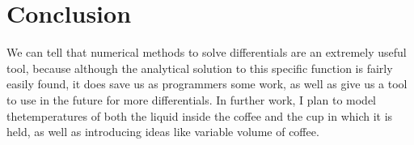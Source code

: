 \documentclass[12pt]{article}
\begin{document}
\section{Conclusion}
We can tell that numerical methods to solve differentials are an extremely useful tool, because although the analytical solution to this specific function is fairly easily found, it does save us as programmers some work, as well as give us a tool to use in the future for more differentials. In further work, I plan to model thetemperatures of both the liquid inside the coffee and the cup in which it is held, as well as introducing ideas like variable volume of coffee.
\end{document}

